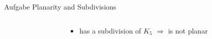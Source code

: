 \begin{frame}[allowframebreaks]{Aufgabe \thesection}{\small Planarity and Subdivisions}
  \begin{solution}
  \end{solution}
  \begin{solution}
    \begin{columns}
      \begin{column}{0.6\textwidth}
      \end{column}
      \begin{column}{0.4\textwidth}
        \begin{itemize}
          \item has a subdivision of $K_5$ $\Rightarrow$ is not planar
        \end{itemize}
      \end{column}
    \end{columns}
  \end{solution}
\end{frame}
